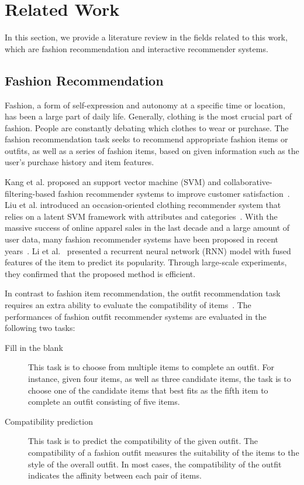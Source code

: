 \chapter{Related Work}
\label{sq:related_work}
In this section, we provide a literature review in the fields related to this work, which are fashion recommendation and interactive recommender systems.

\section{Fashion Recommendation}
Fashion, a form of self-expression and autonomy at a specific time or location, has been a large part of daily life. Generally, clothing is the most crucial part of fashion. People are constantly debating which clothes to wear or purchase. The fashion recommendation task seeks to recommend appropriate fashion items or outfits, as well as a series of fashion items, based on given information such as the user's purchase history and item features. 

Kang et al. proposed an support vector machine (SVM) and collaborative-filtering-based fashion recommender systems to improve customer satisfaction~\cite{kang2007svm}. 
Liu et al. introduced an occasion-oriented clothing recommender system that relies on a latent SVM framework with attributes and categories~\cite{liu2012hi}.
With the massive success of online apparel sales in the last decade and a large amount of user data, many fashion recommender systems have been proposed in recent years~\cite{wang2015joint, hu2015collaborative, kang2017visually, li2017mining}. 
Li et al.~\cite {li2017mining} presented a recurrent neural network (RNN) model with fused features of the item to predict its popularity. 
Through large-scale experiments, they confirmed that the proposed method is efficient.

In contrast to fashion item recommendation, the outfit recommendation task requires an extra ability to evaluate the compatibility of items~\cite{chen2019pog, li2020hierarchical, lin2020outfitnet, verma2020addressing}. 
The performances of fashion outfit recommender systems are evaluated in the following two tasks:
\begin{description}
    \item[Fill in the blank] This task is to choose from multiple items to complete an outfit. For instance, given four items,
     as well as three candidate items, the task is to choose one of the candidate items that best fits as the fifth item to complete an outfit consisting of five items.
    \item[Compatibility prediction] This task is to predict the compatibility of the given outfit. The compatibility of a fashion outfit measures the suitability of the items to the style of the overall outfit. In most cases, the compatibility of the outfit indicates the affinity between each pair of items.
\end{description}

